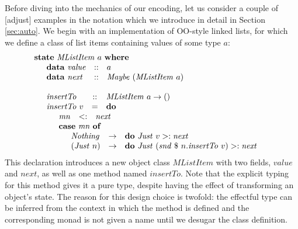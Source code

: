 \documentclass[runningheads,a4paper]{llncs}
\newcommand{\todo}[1]{[{\color{blue}#1}]}
\begin{document}
Before diving into the mechanics of our encoding, let us consider a couple of \todo{adjust} examples in the notation which we introduce in detail in Section \ref{sec:auto}. We begin with an implementation of OO-style linked lists, for which we define a class of list items containing values of some type $a$:
\begin{displaymath}
\begin{array}{l}
\mathbf{state}~\mathit{MListItem}~a~\mathbf{where} \\
\quad \begin{array}{lcl}
\mathbf{data}~\mathit{value} & :: & a \\
\mathbf{data}~\mathit{next}  & :: & \mathit{Maybe}~(\mathit{MListItem}~a)
\end{array}\\\\
\quad \begin{array}{lcl}
\mathit{insertTo} & :: & \mathit{MListItem}~a \to ()\\
\mathit{insertTo}~v & = & \mathbf{do} \\
\multicolumn{3}{l}{\quad \begin{array}{lcl}
\mathit{mn} & <: & \mathit{next} \\
\multicolumn{3}{l}{\mathbf{case}~\mathit{mn}~\mathbf{of}} \\
\multicolumn{3}{l}{\quad \begin{array}{lcl}
\mathit{Nothing} & \to & \mathbf{do}~\mathit{Just}~v >: \mathit{next} \\
(\mathit{Just}~n) & \to & \mathbf{do}~\mathit{Just}~(\mathit{snd}~\$~n.\mathit{insertTo}~v) >: \mathit{next}
\end{array}}
\end{array}}
\end{array}
\end{array}
\end{displaymath}
This declaration introduces a new object class $\mathit{MListItem}$ with two fields, $\mathit{value}$ and $\mathit{next}$, as well as one method named $\mathit{insertTo}$. Note that the explicit typing for this method gives it a pure type, despite having the effect of transforming an object's state. The reason for this design choice is twofold: the effectful type can be inferred from the context in which the method is defined and the corresponding monad is not given a name until we desugar the class definition. %
\end{document}
